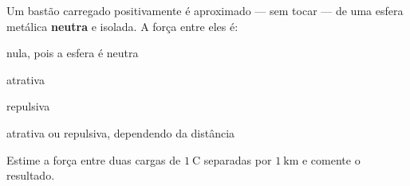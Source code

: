 \begin{questao}[1]{}

Um bastão carregado positivamente é aproximado --- sem tocar --- de uma esfera
metálica \textbf{neutra} e isolada. A força entre eles é:
\begin{alternativas}[2]
\item nula, pois a esfera é neutra
\item atrativa
\item repulsiva
\item atrativa ou repulsiva, dependendo da distância
\end{alternativas}


\end{questao}
\begin{questao}[1]{}

Estime a força entre duas cargas de $\SI{1}{\coulomb}$ separadas por
$\SI{1}{\kilo\meter}$ e comente o resultado.


\end{questao}

